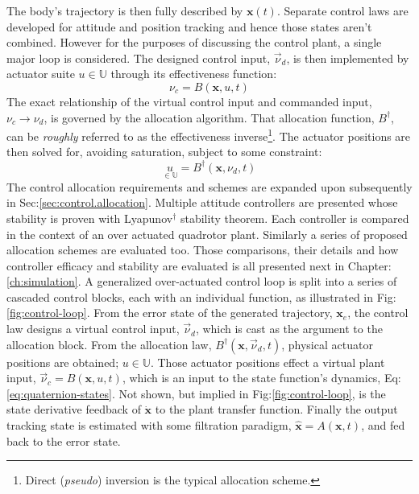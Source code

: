 The body's trajectory is then fully described by $\mathbf{x}(t)$. Separate control laws are developed for attitude and position tracking and hence those states aren't combined. However for the purposes of discussing the control plant, a single major loop is considered. The designed control input, $\vec{\nu}_d$, is then implemented by actuator suite $u\in\mathbb{U}$ through its effectiveness function:
\\
\vspace{-5pt}
\begin{equation}
\nu_c=B(\mathbf{x},u,t)
\end{equation}
The exact relationship of the virtual control input and commanded input, $\nu_c\rightarrow\nu_d$, is governed by the allocation algorithm. That allocation function, $B^\dagger$, can be \emph{roughly} referred to as the effectiveness inverse\footnote{Direct (\emph{pseudo}) inversion is the typical allocation scheme.}. The actuator positions are then solved for, avoiding saturation, subject to some constraint:
\begin{equation}
\underset{\in\mathbb{U}}{u}=B^{\dagger}(\mathbf{x},\nu_d,t)
\end{equation}
The control allocation requirements and schemes are expanded upon subsequently in Sec:\ref{sec:control.allocation}. Multiple attitude controllers are presented whose stability is proven with Lyapunov$^\dagger$ stability theorem. Each controller is compared in the context of an over actuated quadrotor plant. Similarly a series of proposed allocation schemes are evaluated too. Those comparisons, their details and how controller efficacy and stability are evaluated is all presented next in Chapter:\ref{ch:simulation}. 
\newpage
A generalized over-actuated control loop is split into a series of cascaded control blocks, each with an individual function, as illustrated in Fig:\ref{fig:control-loop}. From the error state of the generated trajectory, $\mathbf{x}_e$, the control law designs a virtual control input, $\vec{\nu}_d$, which is cast as the argument to the allocation block. From the allocation law, $B^{\dagger}(\mathbf{x},\vec{\nu}_d,t)$, physical actuator positions are obtained; $u\in\mathbb{U}$. Those actuator positions effect a virtual plant input, $\vec{\nu}_c=B(\mathbf{x},u,t)$, which is an input to the state function's dynamics, Eq:\ref{eq:quaternion-states}. Not shown, but implied in Fig:\ref{fig:control-loop}, is the state derivative feedback of $\dot{\mathbf{x}}$ to the plant transfer function. Finally the output tracking state is estimated with some filtration paradigm, $\hat{\mathbf{x}}=A(\mathbf{x},t)$, and fed back to the error state.
